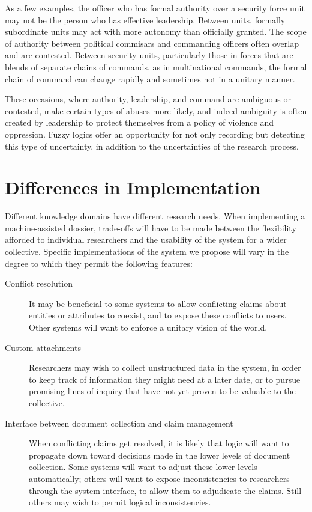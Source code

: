 \documentclass[format=siggraph, review=true]{acmart}
\begin{document}
As a few examples, the officer who has formal authority over a
security force unit may not be the person who has effective
leadership. Between units, formally subordinate units may act with more
autonomy than officially granted. The scope of authority between
political commisars and commanding officers often overlap and are
contested. Between security units, particularly those in forces that
are blends of separate chains of commands, as in multinational
commands, the formal chain of command can change rapidly and sometimes
not in a unitary manner.

These occasions, where authority, leadership, and command are
ambiguous or contested, make certain types of abuses more likely, and
indeed ambiguity is often created by leadership to protect themselves
from a policy of violence and oppression. Fuzzy logics offer an
opportunity for not only recording but detecting this type of
uncertainty, in addition to the uncertainties of the research process.

\section{Differences in Implementation}

Different knowledge domains have different research needs. When
implementing a machine-assisted dossier, trade-offs will have to be made
between the flexibility afforded to individual researchers and the
usability of the system for a wider collective. Specific implementations
of the system we propose will vary in the degree to which they permit
the following features:

\begin{description}
  \item [Conflict resolution] It may be beneficial to some systems to
    allow conflicting claims about entities or attributes to coexist,
    and to expose these conflicts to users. Other systems will want
    to enforce a unitary vision of the world.

  \item [Custom attachments] Researchers may wish to collect unstructured
    data in the system, in order to keep track of information they might
    need at a later date, or to pursue promising lines of inquiry that
    have not yet proven to be valuable to the collective.

  \item [Interface between document collection and claim management] When
    conflicting claims get resolved, it is likely that logic will
    want to propagate down toward decisions made in the lower levels
    of document collection. Some systems will want to adjust these lower
    levels automatically; others will want to expose inconsistencies to
    researchers through the system interface, to allow them to adjudicate
    the claims. Still others may wish to permit logical inconsistencies.
\end{description}
\end{document}
